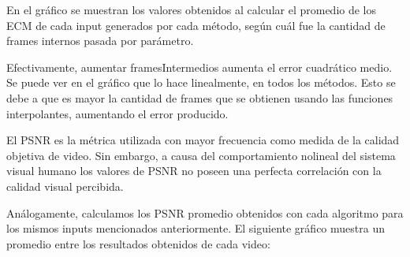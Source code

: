 \begin{figure}[ht]
	\begin{center}
	\end{center}
\end{figure}


\par En el gráfico se muestran los valores obtenidos al calcular el promedio de los ECM de cada input generados por cada método, según cuál fue la cantidad de frames internos pasada por parámetro.
\par Efectivamente, aumentar framesIntermedios aumenta el error cuadrático medio. Se puede ver en el gráfico que lo hace linealmente, en todos los métodos. Esto se debe a que es mayor la cantidad de frames que se obtienen usando las funciones interpolantes, aumentando el error producido.

\newpage


\par El PSNR es la métrica utilizada con mayor frecuencia como medida de la calidad objetiva de video. Sin embargo, a causa del comportamiento nolineal del sistema visual humano los valores de PSNR no poseen una perfecta correlación con la calidad visual percibida. 
\par Análogamente, calculamos los PSNR promedio obtenidos con cada algoritmo para los mismos inputs mencionados anteriormente. El siguiente gráfico muestra un promedio entre los resultados obtenidos de cada video:


